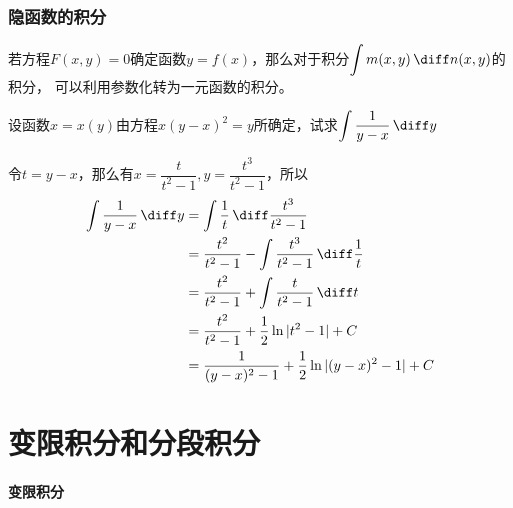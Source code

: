 \subsubsection{隐函数的积分}
若方程$F(x,y)=0$确定函数$y=f(x)$，那么对于积分$\displaystyle\int m(x,y)\,\diff n(x,y)$的积分，
可以利用参数化转为一元函数的积分。
\begin{example}
    设函数$x=x(y)$由方程$x(y-x)^2=y$所确定，试求$\displaystyle\int\frac{1}{y-x}\,\diff y$
\end{example}
\begin{solution}
    令$t=y-x$，那么有$x = \dfrac{t}{t^2-1},y = \dfrac{t^3}{t^2-1}$，所以
    \begin{align*}
        \int\frac{1}{y-x}\,\diff y
         & = \int\frac{1}{t}\,\diff \frac{t^3}{t^2-1}                      \\
         & = \frac{t^2}{t^2-1} - \int \frac{t^3}{t^2-1}\,\diff \frac{1}{t} \\
         & = \frac{t^2}{t^2-1} + \int \frac{t}{t^2-1}\,\diff t             \\
         & = \frac{t^2}{t^2-1} + \frac{1}{2}\ln|t^2-1| + C                 \\
         & = \frac{1}{(y-x)^2-1} + \frac{1}{2}\ln|(y-x)^2-1| + C           \\
    \end{align*}
\end{solution}

\section{变限积分和分段积分}
\paragraph{变限积分}

